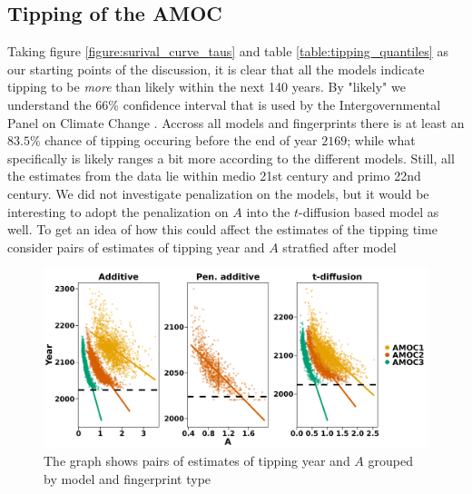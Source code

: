 \subsection{Tipping of the AMOC}
Taking figure \ref{figure:surival_curve_taus} and table \ref{table:tipping_quantiles} as our starting points of the discussion, it is clear that all the models indicate tipping to be \textit{more} than likely within the next 140 years. By "likely" we understand the 66\% confidence interval that is used by the Intergovernmental Panel on Climate Change \cite{Ditlevsen2023}. Accross all models and fingerprints there is at least an $83.5\%$ chance of tipping occuring before the end of year $2169$; while what specifically is likely ranges a bit more according to the different models. Still, all the estimates from the data lie within medio 21st century and primo 22nd century. We did not investigate penalization on the models, but it would be interesting to adopt the penalization on $A$ into the $t$-diffusion based model as well. To get an idea of how this could affect the estimates of the tipping time consider pairs of estimates of tipping year and $A$ stratfied after model
\begin{figure}[h!]
    \includegraphics[scale = .095]{figures/correlation_between_A_and_tau_plot.jpeg}
    \caption{The graph shows pairs of estimates of tipping year and $A$ grouped by model and fingerprint type}
    \label{figure:correlation_A_and_tau}
\end{figure}\\
